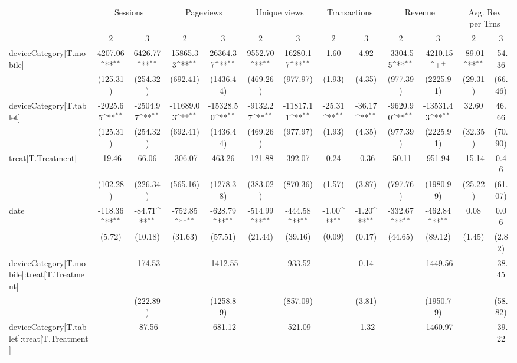 {
\def\sym#1{\ifmmode^{#1}\else\(^{#1}\)\fi}
\begin{tabular}{@{\extracolsep{2pt}}l*{12}{c}@{}}
\hline\hline
& \multicolumn{2}{c}{Sessions} & \multicolumn{2}{c}{Pageviews} & \multicolumn{2}{c}{Unique views} & \multicolumn{2}{c}{Transactions} & \multicolumn{2}{c}{Revenue} & \multicolumn{2}{c}{Avg. Rev per Trns} \\
\cline{2-3}
\cline{4-5}
\cline{6-7}
\cline{8-9}
\cline{10-11}
\cline{12-13}
 & 2 & 3 & 2 & 3 & 2 & 3 & 2 & 3 & 2 & 3 & 2 & 3 \\
\hline
deviceCategory[T.mobile] & 4207.06\sym{**} & 6426.77\sym{**} & 15865.33\sym{**} & 26364.37\sym{**} & 9552.70\sym{**} & 16280.17\sym{**} & 1.60 & 4.92 & -3304.55\sym{**} & -4210.15\sym{+} & -89.01\sym{**} & -54.36 \\
 & (125.31) & (254.32) & (692.41) & (1436.44) & (469.26) & (977.97) & (1.93) & (4.35) & (977.39) & (2225.91) & (29.31) & (66.46) \\
deviceCategory[T.tablet] & -2025.65\sym{**} & -2504.97\sym{**} & -11689.03\sym{**} & -15328.50\sym{**} & -9132.27\sym{**} & -11817.11\sym{**} & -25.31\sym{**} & -36.17\sym{**} & -9620.90\sym{**} & -13531.43\sym{**} & 32.60 & 46.66 \\
 & (125.31) & (254.32) & (692.41) & (1436.44) & (469.26) & (977.97) & (1.93) & (4.35) & (977.39) & (2225.91) & (32.35) & (70.90) \\
treat[T.Treatment] & -19.46 & 66.06 & -306.07 & 463.26 & -121.88 & 392.07 & 0.24 & -0.36 & -50.11 & 951.94 & -15.14 & 0.46 \\
 & (102.28) & (226.34) & (565.16) & (1278.38) & (383.02) & (870.36) & (1.57) & (3.87) & (797.76) & (1980.99) & (25.22) & (61.07) \\
date & -118.36\sym{**} & -84.71\sym{**} & -752.85\sym{**} & -628.79\sym{**} & -514.99\sym{**} & -444.58\sym{**} & -1.00\sym{**} & -1.20\sym{**} & -332.67\sym{**} & -462.84\sym{**} & 0.08 & 0.06 \\
 & (5.72) & (10.18) & (31.63) & (57.51) & (21.44) & (39.16) & (0.09) & (0.17) & (44.65) & (89.12) & (1.45) & (2.82) \\
deviceCategory[T.mobile]:treat[T.Treatment] &  & -174.53 &  & -1412.55 &  & -933.52 &  & 0.14 &  & -1449.56 &  & -38.45 \\
 &  & (222.89) &  & (1258.89) &  & (857.09) &  & (3.81) &  & (1950.79) &  & (58.82) \\
deviceCategory[T.tablet]:treat[T.Treatment] &  & -87.56 &  & -681.12 &  & -521.09 &  & -1.32 &  & -1460.97 &  & -39.22 \\

\end{tabular}}
